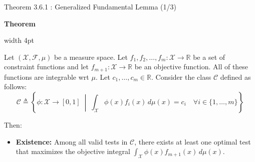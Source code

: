 \documentclass[10pt, aspectratio=169, xcolor=dvipsnames]{beamer}
\newcommand{\lead}[1]{{\color{UniBlue}\bfseries #1}}
\begin{document}
\begin{frame}{Theorem 3.6.1 : Generalized Fundamental Lemma (1/3)}
    
    \lead{Theorem}\\
    \vspace{0.2cm}
    
    \noindent
    {\color{Teal}\vrule width 4pt}%
    \hspace{10pt}%
    \begin{minipage}{\dimexpr\textwidth-14pt\relax}
        \color{Slate}
        Let $(\mathcal{X}, \mathcal{F}, \mu)$ be a measure space. Let $f_1, f_2, \dots, f_m : \mathcal{X} \to \mathbb{R}$ be a set of constraint functions and let $f_{m+1} : \mathcal{X} \to \mathbb{R}$ be an objective function. All of these functions are integrable wrt $\mu$. Let $c_1, \dots, c_m \in \mathbb{R}$. Consider the class $\mathcal{C}$ defined as follows:
        \[
            \mathcal{C} \triangleq \left\{ \phi : \mathcal{X} \to [0,1] \;\middle|\; \int_{\mathcal{X}} \phi(x) f_i(x) \, d\mu(x) = c_i \quad \forall i \in \{1, \dots, m\} \right\}
        \]
        
        \vspace{0.1cm}
        Then:
        \vspace{0.2cm}
        \begin{itemize}
            \item[{\tikz[baseline=(char.base)]{\node[shape=circle,draw=Teal,inner sep=1pt,text=Teal,font=\scriptsize\bfseries] (char) {a};}}] \lead{Existence:} Among all valid tests in $\mathcal{C}$, there exists at least one optimal test that maximizes the objective integral $\displaystyle \int_{\mathcal{X}} \phi(x) f_{m+1}(x) \, d\mu(x)$.
        \end{itemize}
    \end{minipage}
\end{frame}
\end{document}
